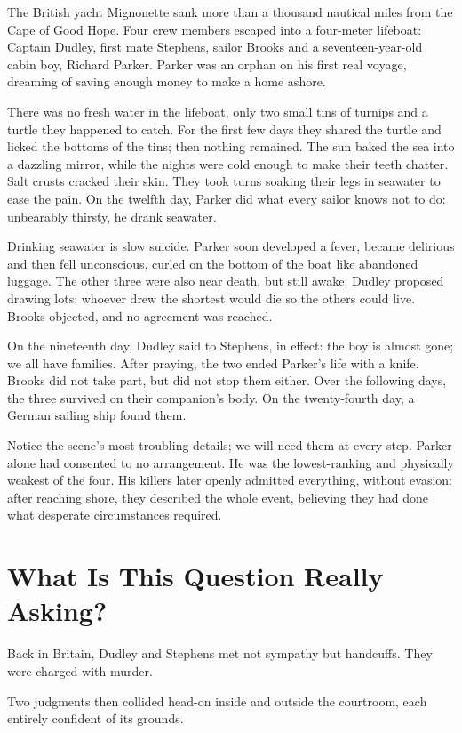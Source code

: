 The British yacht Mignonette sank more than a thousand nautical miles from the Cape of Good Hope. Four crew members escaped into a four-meter lifeboat: Captain Dudley, first mate Stephens, sailor Brooks and a seventeen-year-old cabin boy, Richard Parker. Parker was an orphan on his first real voyage, dreaming of saving enough money to make a home ashore.

There was no fresh water in the lifeboat, only two small tins of turnips and a turtle they happened to catch. For the first few days they shared the turtle and licked the bottoms of the tins; then nothing remained. The sun baked the sea into a dazzling mirror, while the nights were cold enough to make their teeth chatter. Salt crusts cracked their skin. They took turns soaking their legs in seawater to ease the pain. On the twelfth day, Parker did what every sailor knows not to do: unbearably thirsty, he drank seawater.

Drinking seawater is slow suicide. Parker soon developed a fever, became delirious and then fell unconscious, curled on the bottom of the boat like abandoned luggage. The other three were also near death, but still awake. Dudley proposed drawing lots: whoever drew the shortest would die so the others could live. Brooks objected, and no agreement was reached.

On the nineteenth day, Dudley said to Stephens, in effect: the boy is almost gone; we all have families. After praying, the two ended Parker's life with a knife. Brooks did not take part, but did not stop them either. Over the following days, the three survived on their companion's body. On the twenty-fourth day, a German sailing ship found them.

Notice the scene's most troubling details; we will need them at every step. Parker alone had consented to no arrangement. He was the lowest-ranking and physically weakest of the four. His killers later openly admitted everything, without evasion: after reaching shore, they described the whole event, believing they had done what desperate circumstances required.

\section{What Is This Question Really Asking?}
Back in Britain, Dudley and Stephens met not sympathy but handcuffs. They were charged with murder.

Two judgments then collided head-on inside and outside the courtroom, each entirely confident of its grounds.

